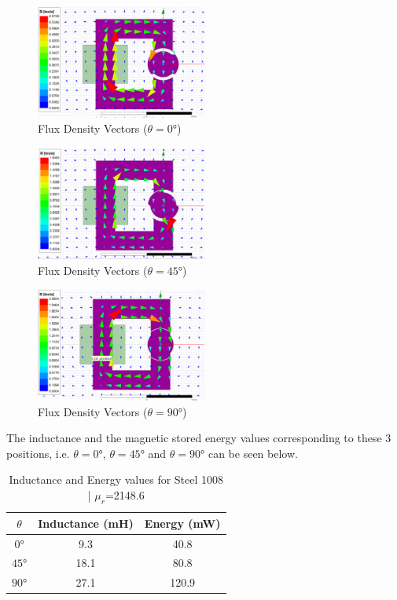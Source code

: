 \documentclass[a4paper, 11pt]{article}
\begin{document}
\begin{figure}[h!]
\centering
\includegraphics[width=0.5\textwidth]{Q2a-0h.png}
\caption{Flux Density Vectors ($\theta=\ang{0}$)}
\end{figure}
\begin{figure}[h!]
\centering
\includegraphics[width=0.5\textwidth]{Q2a-45h.png}
\caption{Flux Density Vectors ($\theta=\ang{45}$)}
\end{figure}
\begin{figure}[h!]
\centering
\includegraphics[width=0.5\textwidth]{Q2a-90h.png}
\caption{Flux Density Vectors ($\theta=\ang{90}$)}
\end{figure}

The inductance and the magnetic stored energy values corresponding to these 3 positions, i.e. $\theta=\ang{0}$, $\theta=\ang{45}$ and $\theta=\ang{90}$ can be seen below.

\begin{table}[htbp]
	\begin{center}
		\begin{tabular}{|c|c|c}
		$\theta$ & Inductance (mH) & Energy (mW)\\
		\hline
		$\ang{0}$ & 9.3 & 40.8\\
		$\ang{45}$ & 18.1 & 80.8\\
		$\ang{90}$ & 27.1 & 120.9\\
		\end{tabular}
	\end{center}
	\caption{Inductance and Energy values for Steel 1008 | $\mu_r$=2148.6}
\end{table}
\end{document}
